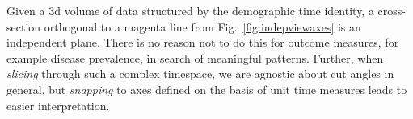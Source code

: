 \documentclass{bmcart}
\begin{document}
Given a 3d volume of data structured by the demographic time identity, a cross-section orthogonal to a magenta line from Fig.~\ref{fig:indepviewaxes} is an independent plane. There is no reason not to do this for outcome measures, for example disease prevalence, in search of meaningful patterns. Further, when \emph{slicing} through such a complex timespace, we are agnostic about cut angles in general, but \emph{snapping} to axes defined on the basis of unit time measures leads to easier interpretation.


\begin{backmatter}



\end{backmatter}
\end{document}
